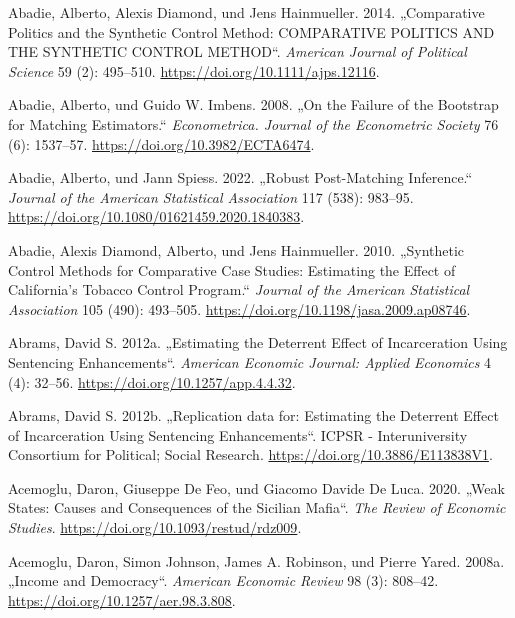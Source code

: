 \documentclass[
  a4paper,
  DIV=11,
  oneside]{scrreprt}
\newlength{\cslhangindent}
\newenvironment{CSLReferences}[2] %
 {\begin{list}{}{%
  \setlength{\itemindent}{0pt}
  \setlength{\leftmargin}{0pt}
  \setlength{\parsep}{0pt}
  \ifodd #1
   \setlength{\leftmargin}{\cslhangindent}
   \setlength{\itemindent}{-1\cslhangindent}
  \fi
  \setlength{\itemsep}{#2\baselineskip}}}
 {\end{list}}
\begin{document}
\label{refs}
\begin{CSLReferences}{1}{0}
Abadie, Alberto, Alexis Diamond, und Jens Hainmueller. 2014.
{„Comparative Politics and the Synthetic Control Method: COMPARATIVE
POLITICS AND THE SYNTHETIC CONTROL METHOD``}. \emph{American Journal of
Political Science} 59 (2): 495--510.
\url{https://doi.org/10.1111/ajps.12116}.

Abadie, Alberto, und Guido W. Imbens. 2008. {„On the Failure of the
Bootstrap for Matching Estimators.``} \emph{Econometrica. Journal of the
Econometric Society} 76 (6): 1537--57.
\url{https://doi.org/10.3982/ECTA6474}.

Abadie, Alberto, und Jann Spiess. 2022. {„Robust Post-Matching
Inference.``} \emph{Journal of the American Statistical Association} 117
(538): 983--95. \url{https://doi.org/10.1080/01621459.2020.1840383}.

Abadie, Alexis Diamond, Alberto, und Jens Hainmueller. 2010. {„Synthetic
Control Methods for Comparative Case Studies: Estimating the Effect of
California's Tobacco Control Program.``} \emph{Journal of the American
Statistical Association} 105 (490): 493--505.
\url{https://doi.org/10.1198/jasa.2009.ap08746}.

Abrams, David S. 2012a. {„Estimating the Deterrent Effect of
Incarceration Using Sentencing Enhancements``}. \emph{American Economic
Journal: Applied Economics} 4 (4): 32--56.
\url{https://doi.org/10.1257/app.4.4.32}.

Abrams, David S. 2012b. {„Replication data for: Estimating the Deterrent
Effect of Incarceration Using Sentencing Enhancements``}. ICPSR -
Interuniversity Consortium for Political; Social Research.
\url{https://doi.org/10.3886/E113838V1}.

Acemoglu, Daron, Giuseppe De Feo, und Giacomo Davide De Luca. 2020.
{„Weak States: Causes and Consequences of the Sicilian Mafia``}.
\emph{The Review of Economic Studies}.
\url{https://doi.org/10.1093/restud/rdz009}.

Acemoglu, Daron, Simon Johnson, James A. Robinson, und Pierre Yared.
2008a. {„Income and Democracy``}. \emph{American Economic Review} 98
(3): 808--42. \url{https://doi.org/10.1257/aer.98.3.808}.


\end{CSLReferences}
\end{document}
